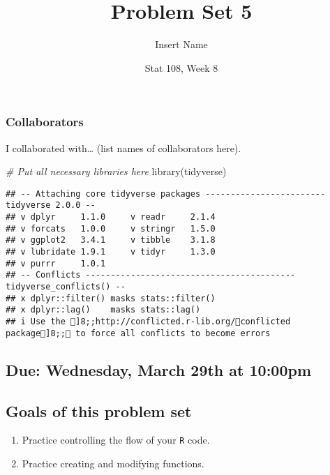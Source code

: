 \documentclass[
]{article}
\title{Problem Set 5}
\author{Insert Name}
\date{Stat 108, Week 8}
\newenvironment{Shaded}{\begin{snugshade}}{\end{snugshade}}
\newcommand{\CommentTok}[1]{\textcolor[rgb]{0.56,0.35,0.01}{\textit{#1}}}
\newcommand{\FunctionTok}[1]{\textcolor[rgb]{0.00,0.00,0.00}{#1}}
\newcommand{\NormalTok}[1]{#1}
\providecommand{\tightlist}{%
  \setlength{\itemsep}{0pt}\setlength{\parskip}{0pt}}
\begin{document}
\maketitle

\hypertarget{collaborators}{%
\subsubsection{Collaborators}\label{collaborators}}

I collaborated with\ldots{} (list names of collaborators here).

\begin{Shaded}
\begin{Highlighting}[]
\CommentTok{\# Put all necessary libraries here}
\FunctionTok{library}\NormalTok{(tidyverse)}
\end{Highlighting}
\end{Shaded}

\begin{verbatim}
## -- Attaching core tidyverse packages ------------------------ tidyverse 2.0.0 --
## v dplyr     1.1.0     v readr     2.1.4
## v forcats   1.0.0     v stringr   1.5.0
## v ggplot2   3.4.1     v tibble    3.1.8
## v lubridate 1.9.1     v tidyr     1.3.0
## v purrr     1.0.1     
## -- Conflicts ------------------------------------------ tidyverse_conflicts() --
## x dplyr::filter() masks stats::filter()
## x dplyr::lag()    masks stats::lag()
## i Use the ]8;;http://conflicted.r-lib.org/conflicted package]8;; to force all conflicts to become errors
\end{verbatim}

\hypertarget{due-wednesday-march-29th-at-1000pm}{%
\subsection{Due: Wednesday, March 29th at
10:00pm}\label{due-wednesday-march-29th-at-1000pm}}

\hypertarget{goals-of-this-problem-set}{%
\subsection{Goals of this problem set}\label{goals-of-this-problem-set}}

\begin{enumerate}
\def\labelenumi{\arabic{enumi}.}
\tightlist
\item
  Practice controlling the flow of your \texttt{R} code.
\item
  Practice creating and modifying functions.
\end{enumerate}
\end{document}
